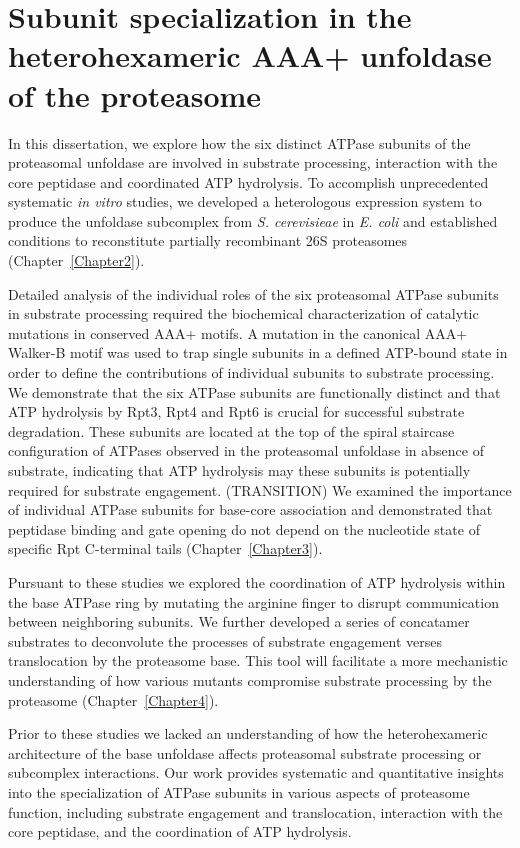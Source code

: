 \section{Subunit specialization in the heterohexameric AAA+ unfoldase of the proteasome}
	In this dissertation, we explore how the six distinct ATPase subunits of the proteasomal unfoldase are involved in substrate processing, interaction with the core peptidase and coordinated ATP hydrolysis.  To accomplish unprecedented systematic \textit{in vitro} studies, we developed a heterologous expression system to produce the unfoldase subcomplex from \textit{S. cerevisieae} in \textit{E. coli} and established conditions to reconstitute partially recombinant 26S proteasomes (Chapter~\ref{Chapter2}).\par
	Detailed analysis of the individual roles of the six proteasomal ATPase subunits in substrate processing required the biochemical characterization of catalytic mutations in conserved AAA+ motifs.  A mutation in the canonical AAA+ Walker\--B motif was used to trap single subunits in a defined ATP-bound state in order to define the contributions of individual subunits to substrate processing.  We demonstrate that the six ATPase subunits are functionally distinct and that ATP hydrolysis by Rpt3, Rpt4 and Rpt6 is crucial for successful substrate degradation.  These subunits are located at the top of the spiral staircase configuration of ATPases observed in the proteasomal unfoldase in absence of substrate, indicating that ATP hydrolysis may these subunits is potentially required for substrate engagement. (TRANSITION) We examined the importance of individual ATPase subunits for base-core association and demonstrated that peptidase binding and gate opening do not depend on the nucleotide state of specific Rpt C-terminal tails (Chapter~\ref{Chapter3}).\par
	Pursuant to these studies we explored the coordination of ATP hydrolysis within the base ATPase ring by  mutating the arginine finger to disrupt communication between neighboring subunits.  We further developed a series of concatamer substrates to deconvolute the processes of substrate engagement verses translocation by the proteasome base.  This tool will facilitate a more mechanistic understanding of how various mutants compromise substrate processing by the proteasome (Chapter~\ref{Chapter4}).\par
	Prior to these studies we lacked an understanding of how the heterohexameric architecture of the base unfoldase affects proteasomal substrate processing or subcomplex interactions.  Our work provides systematic and quantitative insights into the specialization of ATPase subunits in various aspects of proteasome function, including substrate engagement and translocation, interaction with the core peptidase, and the coordination of ATP hydrolysis.\par
	

